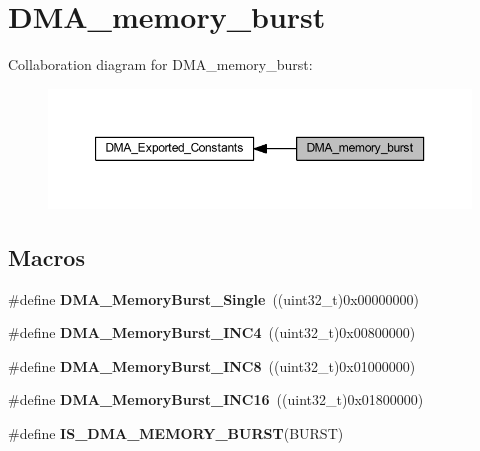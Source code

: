 \hypertarget{group___d_m_a__memory__burst}{}\section{D\+M\+A\+\_\+memory\+\_\+burst}
\label{group___d_m_a__memory__burst}
Collaboration diagram for D\+M\+A\+\_\+memory\+\_\+burst\+:
\nopagebreak
\begin{figure}[H]
\begin{center}
\leavevmode
\includegraphics[width=350pt]{group___d_m_a__memory__burst}
\end{center}
\end{figure}
\subsection*{Macros}
\begin{DoxyCompactItemize}
\item 
\mbox{\label{group___d_m_a__memory__burst_gab3353b3a85b555f826fe567ce68c3fc3}} 
\#define {\bfseries D\+M\+A\+\_\+\+Memory\+Burst\+\_\+\+Single}~((uint32\+\_\+t)0x00000000)
\item 
\mbox{\label{group___d_m_a__memory__burst_gacf7f57731c663fdc6ca8a6fb18ff31b0}} 
\#define {\bfseries D\+M\+A\+\_\+\+Memory\+Burst\+\_\+\+I\+N\+C4}~((uint32\+\_\+t)0x00800000)
\item 
\mbox{\label{group___d_m_a__memory__burst_ga33aca825c5a81e83753ff6fadb3634c0}} 
\#define {\bfseries D\+M\+A\+\_\+\+Memory\+Burst\+\_\+\+I\+N\+C8}~((uint32\+\_\+t)0x01000000)
\item 
\mbox{\label{group___d_m_a__memory__burst_ga4ffd4960f794b187229fac1cea3d81c9}} 
\#define {\bfseries D\+M\+A\+\_\+\+Memory\+Burst\+\_\+\+I\+N\+C16}~((uint32\+\_\+t)0x01800000)
\item 
\#define {\bfseries I\+S\+\_\+\+D\+M\+A\+\_\+\+M\+E\+M\+O\+R\+Y\+\_\+\+B\+U\+R\+ST}(B\+U\+R\+ST)
\end{DoxyCompactItemize}


